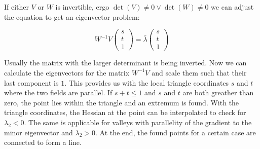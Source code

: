 \noindent If either $V$ or $W$ is invertible, ergo $\det{(V)}\neq 0 \vee
\det{(W)}\neq 0$ we can adjust the equation to get an eigenvector
problem:

\begin{equation}
  W^{-1} V
  \begin{pmatrix}
    s\\
    t\\
    1
  \end{pmatrix}
  = \bar{\lambda}
  \begin{pmatrix}
    s\\
    t\\
    1
  \end{pmatrix}
\end{equation}

\noindent Usually the matrix with the larger determinant is being
inverted. Now we can calculate the eigenvectors for the matrix $W^{-1}
V$ and scale them such that their last component is $1$. This provides
us with the local triangle coordinates $s$ and $t$ where the two fields
are parallel. If $s+t \leq 1$ and $s$ and $t$ are both greather than
zero, the point lies within the triangle and an extremum is found. With
the triangle coordinates, the Hessian at the point can be interpolated to
check for $\lambda_2 < 0$. The same is applicable for valleys with
parallelity of the gradient to the minor eigenvector and $\lambda_2 > 0$.
At the end, the found points for a certain case are connected to form a
line.
